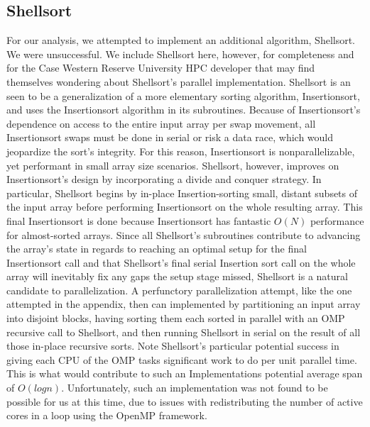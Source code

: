 \documentclass[conference]{IEEEtran}
\begin{document}
	\subsection{Shellsort}
	
	For our analysis, we attempted to implement an additional algorithm, Shellsort. We were unsuccessful. We include Shellsort here, however, for completeness and for the Case Western Reserve University HPC developer that may find themselves wondering about Shellsort's parallel implementation. Shellsort is an seen to be a generalization of a more elementary sorting algorithm, Insertionsort, and uses the Insertionsort algorithm in its subroutines. Because of Insertionsort's dependence on access to the entire input array per swap movement, all Insertionsort swaps must be done in serial or risk a data race, which would jeopardize the sort's integrity. For this reason, Insertionsort is nonparallelizable, yet performant in small array size scenarios. Shellsort, however, improves on Insertionsort's design by incorporating a divide and conquer strategy. In particular, Shellsort begins by in-place Insertion-sorting small, distant subsets of the input array before performing Insertionsort on the whole resulting array. This final Insertionsort is done because Insertionsort has fantastic $O(N)$ performance for almost-sorted arrays.  Since all Shellsort's subroutines contribute to advancing the array's state in regards to reaching an optimal setup for the final Insertionsort call and that Shellsort's final serial Insertion sort call on the whole array will inevitably fix any gaps the setup stage missed, Shellsort is a natural candidate to parallelization. A perfunctory parallelization attempt, like the one attempted in the appendix, then can implemented by partitioning an input array into disjoint blocks, having sorting them each sorted in parallel with an OMP recursive call to Shellsort, and then running Shellsort in serial on the result of all those in-place recursive sorts. Note Shellsort's particular potential success in giving each CPU of the OMP tasks significant work to do per unit parallel time. This is what would contribute to such an Implementations potential average span of $O(logn)$. Unfortunately, such an implementation was not found to be possible for us at this time, due to issues with redistributing the number of active cores in a loop using the OpenMP framework.  
	
\end{document}
